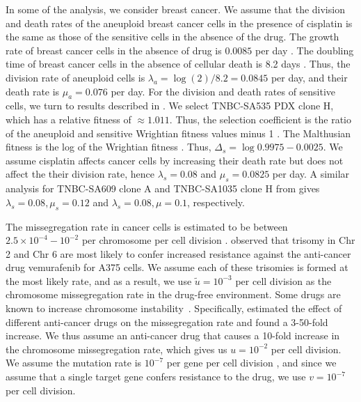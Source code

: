 \documentclass[12pt]{extarticle}
\begin{document}
In some of the analysis, we consider breast cancer. We assume that the division and death rates of the aneuploid breast cancer cells in the presence of cisplatin is the same as those of the sensitive cells in the absence of the drug. 
The growth rate of breast cancer cells in the absence of drug is $0.0085$ per day \citep{spratt1996rates}. The doubling time of breast cancer cells in the absence of cellular death is 8.2 days \citep{rew2000cell}. Thus, the division rate of aneuploid cells is $\lambda_a=\log{(2)}/8.2=0.0845$ per day, and their death rate is $\mu_a=0.076$ per day.
For the division and death rates of sensitive cells, we turn to results described in \citet{salehi2021clonal}. We select TNBC-SA535 PDX clone H, which has a relative fitness of $\approx 1.011$. Thus, the selection coefficient is the ratio of the aneuploid and sensitive Wrightian fitness values minus 1 \citep{chevin2011measuring}. The Malthusian fitness is the log of the Wrightian fitness \citep{Wu2013a}. Thus, $\Delta_s = \log{0.9975} -0.0025$. 
We assume cisplatin affects cancer cells by increasing their death rate but does not affect the their division rate, hence $\lambda_s=0.08$ and $\mu_s=0.0825$ per day.
A similar analysis for TNBC-SA609 clone A and TNBC-SA1035 clone H from \citet{salehi2021clonal} gives $\lambda_s=0.08, \mu_s=0.12$ and $\lambda_s=0.08, \mu=0.1$, respectively.

The missegregation rate in cancer cells is estimated to be between $2.5\times10^{-4}-10^{-2}$ per chromosome per cell division \citep{shi2005chromosome,thompson2008examining}. \citet{ippolito2021gene} observed that trisomy in Chr 2 and Chr 6 are most likely to confer increased resistance against the anti-cancer drug vemurafenib for A375 cells. We assume each of these trisomies is formed at the most likely rate, and as a result, we use $\tilde{u}=10^{-3}$ per cell division as the chromosome missegregation rate in the drug-free environment. 
Some drugs are known to increase chromosome instability~\citep{wang2019molecular,mason2017functional}. 
Specifically, \citet{lee2016effects} estimated the effect of different anti-cancer drugs on the missegregation rate and found a 3-50-fold increase.
We thus assume an anti-cancer drug that causes a 10-fold increase in the chromosome missegregation rate, which gives us $u=10^{-2}$ per cell division. We assume the mutation rate is $10^{-7}$ per gene per cell division \citep{loeb2001mutator}, and since we assume that a single target gene confers resistance to the drug, we use $v=10^{-7}$ per cell division. 
\end{document}
